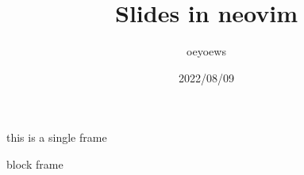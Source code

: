 \documentclass{beamer}
\title{Slides in neovim}
\author{oeyoews}
\date{2022/08/09}
\begin{document}
\maketitle

\frame

this is a single frame

\begin{frame}
  block frame
\end{frame}
\end{document}
